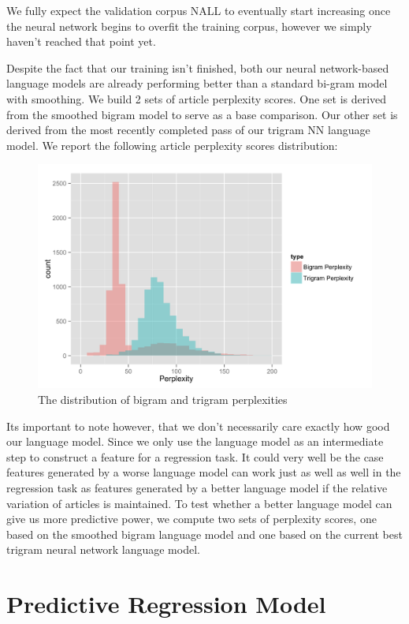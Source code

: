 \documentclass[fleqn,12pt]{SelfArx} %
\begin{document}
We fully expect the validation corpus NALL to eventually start increasing once the neural network begins to overfit the training corpus, however we simply haven't reached that point yet. 
 
Despite the fact that our training isn't finished, both our neural network-based language models are already performing better than a standard bi-gram model with smoothing. We build 2 sets of article perplexity scores. One set is derived from the smoothed bigram model to serve as a base comparison. Our other set is derived from the most recently completed pass of our trigram NN language model. We report the following article perplexity scores distribution:


\begin{figure}[ht]
\includegraphics[width=\linewidth]{perplexity.png}
\caption{The distribution of bigram and trigram perplexities}
\label{fig:perp_hist}
\end{figure}

Its important to note however, that we don't necessarily care exactly how good our language model. Since we only use the language model as an intermediate step to construct a feature for a regression task. It could very well be the case features generated by a worse language model can work just as well as well in the regression task as features generated by a better language model if the relative variation of articles is maintained. To test whether a better language model can give us more predictive power, we compute two sets of perplexity scores, one based on the smoothed bigram language model and one based on the current best trigram neural network language model. 


\section{Predictive Regression Model}
\end{document}
